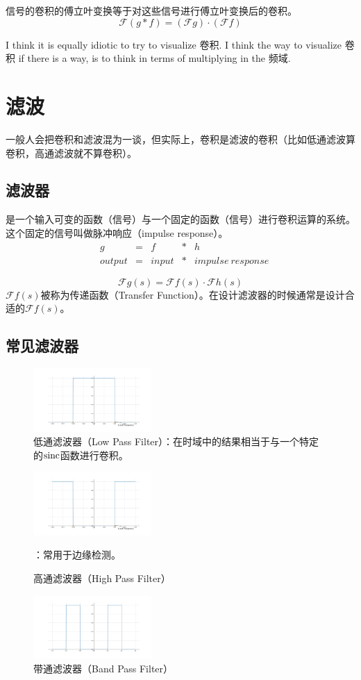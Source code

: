 信号的卷积的傅立叶变换等于对这些信号进行傅立叶变换后的卷积。
\begin{equation}
	\mathcal{F}(g*f)=(\mathcal{F}g)\cdot(\mathcal{F}f)
\end{equation}

I think it is equally idiotic to try to visualize 卷积. I think the way to visualize 卷积 if there is a way, is to think in terms of multiplying in the 频域.
\section{滤波}
一般人会把卷积和滤波混为一谈，但实际上，卷积是滤波的卷积（比如低通滤波算卷积，高通滤波就不算卷积）。
\subsection{滤波器}
是一个输入可变的函数（信号）与一个固定的函数（信号）进行卷积运算的系统。这个固定的信号叫做脉冲响应（impulse response）。
\begin{align*}
	 & g      & = & f     & * & h                 \\
	 & output & = & input & * & impulse\ response
\end{align*}

$$
	\mathcal{F}g(s)=\mathcal{F}f(s)\cdot \mathcal{F}h(s)
$$
$\mathcal{F}f(s)$被称为传递函数（Transfer Function）。在设计滤波器的时候通常是设计合适的$\mathcal{F}f(s)$。
\subsection{常见滤波器}
\begin{figure}[H]
	\centering
	\includegraphics[width=0.4\textwidth]{assets/Figure_5.png}
	\caption{低通滤波器（Low Pass Filter）：在时域中的结果相当于与一个特定的$\operatorname{sinc}$函数进行卷积。}
\end{figure}
\begin{figure}[H]
	\centering
	\includegraphics[width=0.4\textwidth]{assets/Figure_6.png}
	\caption{高通滤波器（High Pass Filter）}：常用于边缘检测。
\end{figure}
\begin{figure}[H]
	\centering
	\includegraphics[width=0.4\textwidth]{assets/Figure_7.png}
	\caption{带通滤波器（Band Pass Filter）}
\end{figure}
